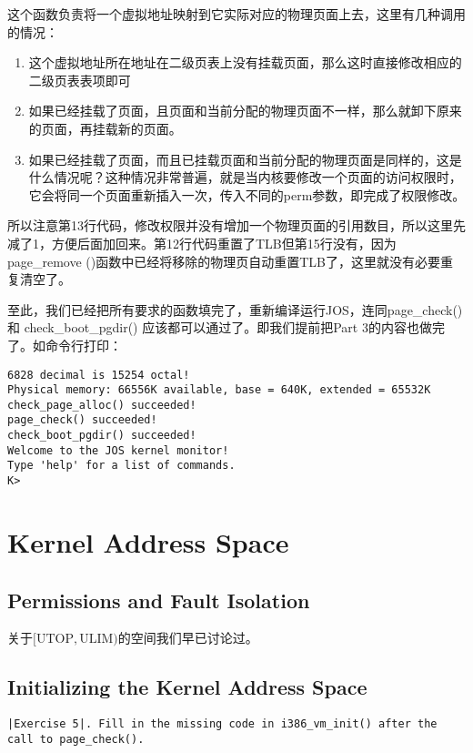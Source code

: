 \documentclass{article}
\newcommand{\funcname}[1]{{\ttfamily \small #1}}
\begin{document}
\begin{CJK*}{UTF8}{gkai}
这个函数负责将一个虚拟地址映射到它实际对应的物理页面上去，这里有几种调用的情况：

\begin{enumerate}
\item{这个虚拟地址所在地址在二级页表上没有挂载页面，那么这时直接修改相应的二级页表表项即可}
\item{如果已经挂载了页面，且页面和当前分配的物理页面不一样，那么就卸下原来的页面，再挂载新的页面。}
\item{如果已经挂载了页面，而且已挂载页面和当前分配的物理页面是同样的，这是什么情况呢？这种情况非常普遍，就是当内核要修改一个页面的访问权限时，它会将同一个页面重新插入一次，传入不同的perm参数，即完成了权限修改。}
\end{enumerate}

所以注意第13行代码，修改权限并没有增加一个物理页面的引用数目，所以这里先减了1，方便后面加回来。第12行代码重置了TLB但第15行没有，因为\funcname{page\_remove ()}函数中已经将移除的物理页自动重置TLB了，这里就没有必要重复清空了。

至此，我们已经把所有要求的函数填完了，重新编译运行JOS，连同page\_check() 和 check\_boot\_pgdir() 应该都可以通过了。即我们提前把Part 3的内容也做完了。如命令行打印：

\begin{lstlisting}[style=console]
6828 decimal is 15254 octal!
Physical memory: 66556K available, base = 640K, extended = 65532K
check_page_alloc() succeeded!
page_check() succeeded!
check_boot_pgdir() succeeded!
Welcome to the JOS kernel monitor!
Type 'help' for a list of commands.
K> 
\end{lstlisting}


\section{Kernel Address Space}

\subsection{Permissions and Fault Isolation}

关于$[\mathrm{UTOP},\mathrm{ULIM})$的空间我们早已讨论过。

\subsection{Initializing the Kernel Address Space}

\begin{lstlisting}[style=exercise]
|Exercise 5|. Fill in the missing code in i386_vm_init() after the call to page_check().


\end{lstlisting}
\end{CJK*}
\end{document}
